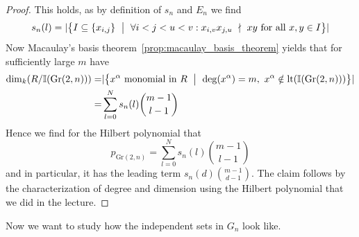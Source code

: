 \documentclass{scrartcl}
\newcommand{\I}{\mathbb{I}}
\newcommand{\Gr}{\mathrm{Gr}}
\theoremstyle{definition}
\begin{document}
\begin{proof}
    This holds, as by definition of $s_n$ and $E_n$ we find
    \begin{equation*}
        s_n(l) = |\bigl\{ I \subseteq \{ x_{i, j} \} \ \bigm| \ \forall i < j < u < v: x_{i, v} x_{j, u} \ \nmid \ xy \ \text{for all} \ x, y \in I \bigr\}|
    \end{equation*}
    Now Macaulay's basis theorem~\ref{prop:macaulay_basis_theorem} yields that for sufficiently large $m$ have
    \begin{align*}
        \dim_k (R/\I(\Gr(2, n))) =& |\bigl\{ x^\alpha \ \text{monomial in $R$} \ \bigm| \ \deg(x^\alpha) = m, \ x^\alpha \notin \mathrm{lt}(\I(\Gr(2, n))) \bigr\}| \\
        =& \sum_{l = 0}^N s_n(l) {m - 1 \choose l - 1}
    \end{align*}
    Hence we find for the Hilbert polynomial that
    \begin{equation*}
        p_{\Gr(2, n)} = \sum_{l = 0}^N s_n(l) {m - 1 \choose l - 1}
    \end{equation*}
    and in particular, it has the leading term $s_n(d) {m - 1 \choose d - 1}$.
    The claim follows by the characterization of degree and dimension using the Hilbert polynomial that we did in the lecture.
\end{proof}
Now we want to study how the independent sets in $G_n$ look like.
\end{document}
